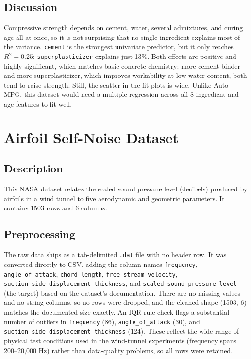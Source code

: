 \documentclass[11pt]{article}
\begin{document}
\subsection{Discussion}
Compressive strength depends on cement, water, several admixtures, and
curing age all at once, so it is not surprising that no single ingredient
explains most of the variance. \texttt{cement} is the strongest univariate
predictor, but it only reaches $R^2 = 0.25$; \texttt{superplasticizer}
explains just 13\%. Both effects are positive and highly significant, which
matches basic concrete chemistry: more cement binder and more
superplasticizer, which improves workability at low water content, both tend
to raise strength. Still, the scatter in the fit plots is wide. Unlike Auto
MPG, this dataset would need a multiple regression across all 8 ingredient
and age features to fit well.

\clearpage
\section{Airfoil Self-Noise Dataset}

\subsection{Description}
This NASA dataset relates the scaled sound pressure level (decibels)
produced by airfoils in a wind tunnel to five aerodynamic and geometric
parameters. It contains 1503 rows and 6 columns.

\subsection{Preprocessing}
\begin{sloppypar}
The raw data ships as a tab-delimited \texttt{.dat} file with no header row.
It was converted directly to CSV, adding the column names \texttt{frequency},
\texttt{angle\_of\_attack}, \texttt{chord\_length},
\texttt{free\_stream\_velocity}, \texttt{suction\_side\_displacement\_thickness},
and \texttt{scaled\_sound\_pressure\_level} (the target) based on the
dataset's documentation. There are no missing values and no string columns,
so no rows were dropped, and the cleaned shape (1503, 6) matches the
documented size exactly. An IQR-rule check flags a substantial number of
outliers in \texttt{frequency} (86), \texttt{angle\_of\_attack} (30), and
\texttt{suction\_side\_displacement\_thickness} (124). These reflect the
wide range of physical test conditions used in the wind-tunnel experiments
(frequency spans 200--20{,}000 Hz) rather than data-quality problems, so all
rows were retained.
\end{sloppypar}
\end{document}
